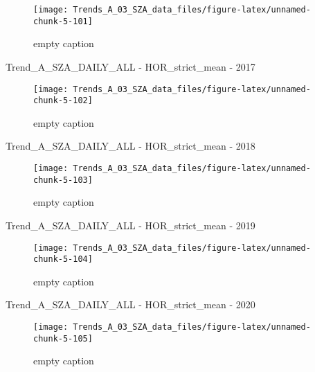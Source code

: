 \documentclass[
  10pt,
  a4paper,oneside]{article}
\begin{document}
\begin{figure}[!ht]

{\centering \texttt{[image: Trends\_A\_03\_SZA\_data\_files/figure-latex/unnamed-chunk-5-101]} 

}

\caption{ empty caption }\label{fig:unnamed-chunk-5-101}
\end{figure}

Trend\_A\_SZA\_DAILY\_ALL - HOR\_strict\_mean - 2017

\begin{figure}[!ht]

{\centering \texttt{[image: Trends\_A\_03\_SZA\_data\_files/figure-latex/unnamed-chunk-5-102]} 

}

\caption{ empty caption }\label{fig:unnamed-chunk-5-102}
\end{figure}

Trend\_A\_SZA\_DAILY\_ALL - HOR\_strict\_mean - 2018

\begin{figure}[!ht]

{\centering \texttt{[image: Trends\_A\_03\_SZA\_data\_files/figure-latex/unnamed-chunk-5-103]} 

}

\caption{ empty caption }\label{fig:unnamed-chunk-5-103}
\end{figure}

Trend\_A\_SZA\_DAILY\_ALL - HOR\_strict\_mean - 2019

\begin{figure}[!ht]

{\centering \texttt{[image: Trends\_A\_03\_SZA\_data\_files/figure-latex/unnamed-chunk-5-104]} 

}

\caption{ empty caption }\label{fig:unnamed-chunk-5-104}
\end{figure}

Trend\_A\_SZA\_DAILY\_ALL - HOR\_strict\_mean - 2020

\begin{figure}[!ht]

{\centering \texttt{[image: Trends\_A\_03\_SZA\_data\_files/figure-latex/unnamed-chunk-5-105]} 

}

\caption{ empty caption }\label{fig:unnamed-chunk-5-105}
\end{figure}
\end{document}
